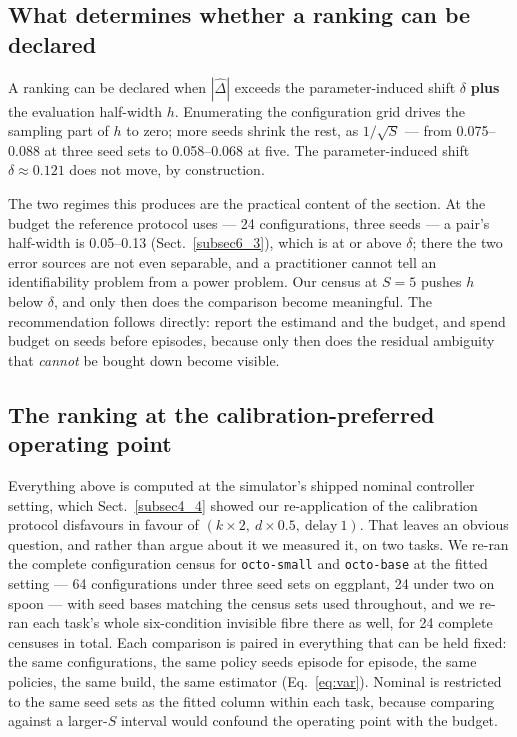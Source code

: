 \documentclass[pdflatex,iicol,sn-apa]{sn-jnl}
\theoremstyle{remark}
\begin{document}
\subsection{What determines whether a ranking can be declared}\label{subsec7_6}

A ranking can be declared when $|\hat\Delta|$ exceeds the parameter-induced shift $\delta$
\textbf{plus} the evaluation half-width $h$. Enumerating the configuration grid drives the sampling
part of $h$ to zero; more seeds shrink the rest, as $1/\sqrt{S}$ --- from 0.075--0.088 at three seed
sets to 0.058--0.068 at five. The parameter-induced shift $\delta \approx 0.121$ does not move, by
construction.

The two regimes this produces are the practical content of the section. At the budget the reference
protocol uses --- 24 configurations, three seeds --- a pair's half-width is 0.05--0.13
(Sect.~\ref{subsec6_3}), which is at or above $\delta$; there the two error sources are not even
separable, and a practitioner cannot tell an identifiability problem from a power problem. Our census
at $S = 5$ pushes $h$ below $\delta$, and only then does the comparison become meaningful. The
recommendation follows directly: report the estimand and the budget, and spend budget on seeds
before episodes, because only then does the residual ambiguity that \emph{cannot} be bought down
become visible.

\subsection{The ranking at the calibration-preferred operating point}\label{subsec7_7}

Everything above is computed at the simulator's shipped nominal controller setting, which
Sect.~\ref{subsec4_4} showed our re-application of the calibration protocol disfavours in favour of
$(k{\times}2,\ d{\times}0.5,\ \text{delay}\ 1)$. That leaves an obvious question, and rather than
argue about it we measured it, on two tasks. We re-ran the complete configuration census for
\texttt{octo-small} and \texttt{octo-base} at the fitted setting --- 64 configurations under three
seed sets on eggplant, 24 under two on spoon --- with seed bases matching the census sets used
throughout, and we re-ran each task's whole six-condition invisible fibre there as well, for 24
complete censuses in total. Each comparison is paired in everything that can be
held fixed: the same configurations, the same policy seeds episode for episode, the same
policies, the same build, the same estimator (Eq.~\eqref{eq:var}). Nominal is restricted to the
same seed sets as the fitted column within each task, because comparing against a larger-$S$
interval would confound the operating point with the budget.
\end{document}
